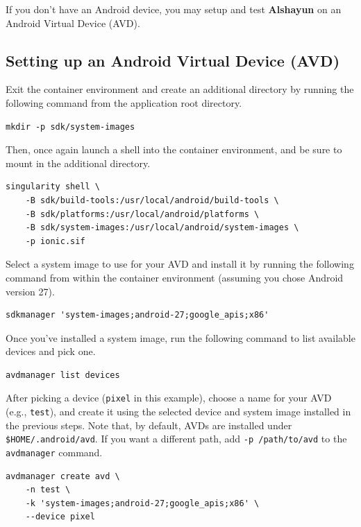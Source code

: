 \documentclass[12pt]{report}
\begin{document}
If you don't have an Android device, you may setup and test \textbf{Alshayun} on
an Android Virtual Device (AVD).

        \subsection{Setting up an Android Virtual Device (AVD)}

Exit the container environment and create an additional directory by running the
following command from the application root directory.

\begin{verbatim}
mkdir -p sdk/system-images
\end{verbatim}

Then, once again launch a shell into the container environment, and be sure to
mount in the additional directory.

\begin{verbatim}
singularity shell \
    -B sdk/build-tools:/usr/local/android/build-tools \
    -B sdk/platforms:/usr/local/android/platforms \
    -B sdk/system-images:/usr/local/android/system-images \
    -p ionic.sif
\end{verbatim}

Select a system image to use for your AVD and install it by running the
following command from within the container environment (assuming you chose
Android version 27).

\begin{verbatim}
sdkmanager 'system-images;android-27;google_apis;x86'
\end{verbatim}

Once you've installed a system image, run the following command to list
available devices and pick one.

\begin{verbatim}
avdmanager list devices
\end{verbatim}

After picking a device (\texttt{pixel} in this example), choose a name for your
AVD (e.g., \texttt{test}), and create it using the selected device and system
image installed in the previous steps. Note that, by default, AVDs are installed
under \texttt{\$HOME/.android/avd}. If you want a different path, add \texttt{-p
/path/to/avd} to the \texttt{avdmanager} command.

\begin{verbatim}
avdmanager create avd \
    -n test \
    -k 'system-images;android-27;google_apis;x86' \
    --device pixel
\end{verbatim}
\end{document}
